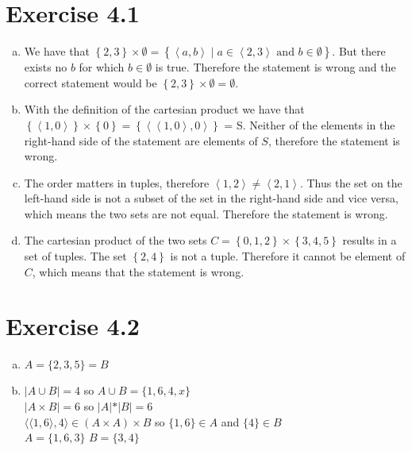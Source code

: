 \documentclass{article} %
\newcommand{\homeworkNumber}{4}
\begin{document}
\section*{Exercise \homeworkNumber.1}
\begin{enumerate}[(a)]
	\item We have that \( \left\{ 2,3 \right\} \times \emptyset
	      = \left\{ \left< a,b \right> \mid a \in \left< 2, 3\right>
	      \text{ and } b \in \emptyset \right\}\). But there exists no
	      \( b \) for which \( b \in \emptyset \) is true.
	      Therefore the statement is wrong and the correct statement would be
	      \( \left\{ 2,3 \right\} \times \emptyset = \emptyset \).
	\item With the definition of the cartesian product we have that
	      \( \left\{ \left< 1,0 \right> \right\} \times \left\{ 0 \right\}
	      = \left\{ \left< \left< 1,0 \right>, 0 \right>\right\}  \) = S.
	      Neither of the elements in the right-hand side of the statement are elements of \( S \),
	      therefore the statement is wrong.
	\item The order matters in tuples, therefore \( \left< 1,2 \right> \neq \left< 2,1 \right> \).
	      Thus the set on the left-hand side is not a subset of the set in the right-hand side and vice versa,
	      which means the two sets are not equal. Therefore the statement is wrong.
	\item The cartesian product of the two sets
	      \( C = \left\{ 0, 1, 2 \right\} \times \left\{ 3,4,5 \right\}  \) results in a set of tuples.
	      The set \( \left\{ 2,4 \right\}  \)  is not a tuple.
	      Therefore it cannot be element of \( C \), which
	      means that the statement is wrong.

\end{enumerate}

\section*{Exercise \homeworkNumber.2}
\begin{enumerate}[(a)]
	\item $A = \{2,3,5\} = B$
	\item $\lvert A \cup B\lvert = 4$  so $A \cup B = \{1,6,4,x\}$ \\
	      $\lvert A \times B \lvert = 6$ so $\lvert A\lvert  * \lvert B\lvert  = 6$ \\
	      $\langle\langle 1,6 \rangle,4\rangle \in (A \times A) \times B$ so $ \{1,6\} \in A$ and $ \{4\} \in B$ \\
	      $ A = \{1,6,3\}$ $B = \{3,4\}$
\end{enumerate}
\end{document}
